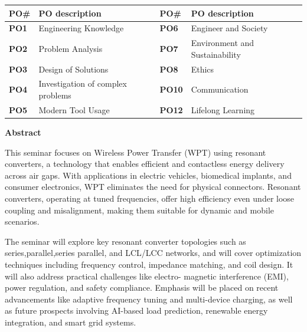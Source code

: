 \documentclass[12pt,a4paper]{report}
\begin{document}
\vspace{0.1cm}

\begin{table}[h]
\centering
\begin{tabular}{|l|p{5.5cm}|l|p{5.5cm}|}
\hline

\rowcolor[HTML]{C0C0C0}
\textbf{PO\#} & \textbf{PO description} & \textbf{PO\#} & \textbf{PO description} \\ \hline

\textbf{PO1} & Engineering Knowledge & \textbf{PO6} & Engineer and Society \\ \hline
\textbf{PO2} & Problem Analysis & \textbf{PO7} & Environment and Sustainability \\ \hline
\textbf{PO3} & Design of Solutions & \textbf{PO8} & Ethics \\ \hline
\textbf{PO4} & Investigation of complex problems & \textbf{PO10} & Communication \\ \hline
\textbf{PO5} & Modern Tool Usage & \textbf{PO12} & Lifelong Learning \\ \hline

\end{tabular}
\end{table}
\newpage

\titlespacing*{\chapter}{-40pt}{-60pt}{-000pt} %

\begin{center}
    \textbf{\LARGE Abstract}
\end{center}

\vspace{1em}

\noindent
\hspace{2em}This seminar focuses on Wireless Power Transfer (WPT) using resonant converters, a technology
that enables efficient and contactless energy delivery across air gaps. With applications in electric
vehicles, biomedical implants, and consumer electronics, WPT eliminates the need for physical
connectors. Resonant converters, operating at tuned frequencies, offer high efficiency even under
loose coupling and misalignment, making them suitable for dynamic and mobile scenarios.
\vspace{0.5em}

\noindent
\hspace{2em}The seminar will explore key resonant converter topologies such as series,parallel,series parallel, and LCL/LCC networks, and will cover optimization techniques including frequency
control, impedance matching, and coil design. It will also address practical challenges like electro-
magnetic interference (EMI), power regulation, and safety compliance. Emphasis will be placed
on recent advancements like adaptive frequency tuning and multi-device charging, as well as future prospects involving AI-based load prediction, renewable energy integration, and smart grid systems.
\end{document}
